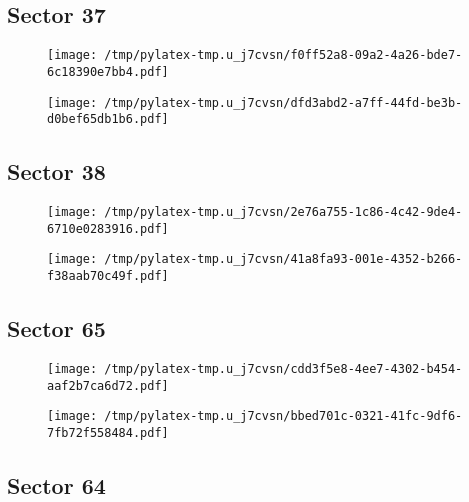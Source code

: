 \documentclass{report}%
\begin{document}
%
\subsection{Sector 37}%
\label{subsec:40575444837}%


\begin{figure}[H]%
\centering%
\centering%
\texttt{[image: /tmp/pylatex-tmp.u\_j7cvsn/f0ff52a8-09a2-4a26-bde7-6c18390e7bb4.pdf]}%
\end{figure}

%


\begin{figure}[H]%
\centering%
\texttt{[image: /tmp/pylatex-tmp.u\_j7cvsn/dfd3abd2-a7ff-44fd-be3b-d0bef65db1b6.pdf]}%
\end{figure}

%
\subsection{Sector 38}%
\label{subsec:40575444838}%


\begin{figure}[H]%
\centering%
\centering%
\texttt{[image: /tmp/pylatex-tmp.u\_j7cvsn/2e76a755-1c86-4c42-9de4-6710e0283916.pdf]}%
\end{figure}

%


\begin{figure}[H]%
\centering%
\texttt{[image: /tmp/pylatex-tmp.u\_j7cvsn/41a8fa93-001e-4352-b266-f38aab70c49f.pdf]}%
\end{figure}

%
\subsection{Sector 65}%
\label{subsec:40575444865}%


\begin{figure}[H]%
\centering%
\centering%
\texttt{[image: /tmp/pylatex-tmp.u\_j7cvsn/cdd3f5e8-4ee7-4302-b454-aaf2b7ca6d72.pdf]}%
\end{figure}

%


\begin{figure}[H]%
\centering%
\texttt{[image: /tmp/pylatex-tmp.u\_j7cvsn/bbed701c-0321-41fc-9df6-7fb72f558484.pdf]}%
\end{figure}

%
\subsection{Sector 64}%
\label{subsec:40575444864}%
\end{document}
